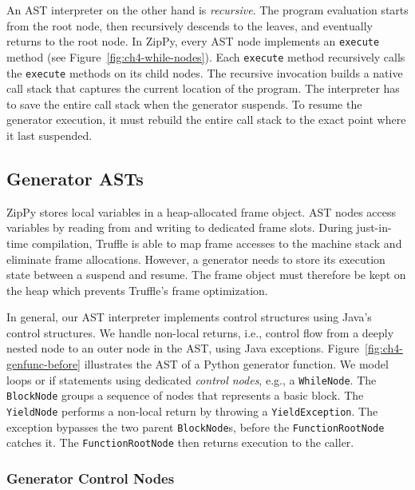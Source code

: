 An AST interpreter on the other hand is \emph{recursive}.
The program evaluation starts from the root node, then recursively descends to the leaves, and eventually returns to the root node.
In ZipPy, every AST node implements an \texttt{execute} method (see Figure~\ref{fig:ch4-while-nodes}).
Each \texttt{execute} method recursively calls the \texttt{execute} methods on its child nodes.
The recursive invocation builds a native call stack that captures the current location of the program.
The interpreter has to save the entire call stack when the generator suspends.
To resume the generator execution, it must rebuild the entire call stack to the exact point where it last suspended.

\subsection{Generator ASTs}
\label{sec:ch4-generator-ast}

ZipPy stores local variables in a heap-allocated frame object.
AST nodes access variables by reading from and writing to dedicated frame slots.
During just-in-time compilation, Truffle is able to map frame accesses to the machine stack and eliminate frame allocations.
However, a generator needs to store its execution state between a suspend and resume.
The frame object must therefore be kept on the heap which prevents Truffle's frame optimization.

In general, our AST interpreter implements control structures using Java's control structures.
We handle non-local returns, i.e., control flow from a deeply nested node to an outer node in the AST, using Java exceptions.
Figure~\ref{fig:ch4-genfunc-before} illustrates the AST of a Python generator function.
We model loops or if statements using dedicated \emph{control nodes}, e.g., a \texttt{WhileNode}.
The \texttt{BlockNode} groups a sequence of nodes that represents a basic block.
The \texttt{YieldNode} performs a non-local return by throwing a \texttt{YieldException}.
The exception bypasses the two parent \texttt{BlockNode}s, before the \texttt{FunctionRootNode} catches it.
The \texttt{FunctionRootNode} then returns execution to the caller.

\subsubsection*{Generator Control Nodes}

